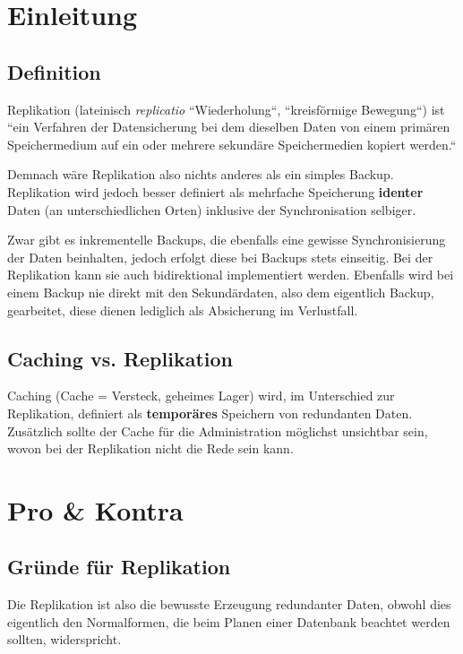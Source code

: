 
\section{Einleitung}
\subsection{Definition}
Replikation (lateinisch \textit{replicatio} \cite{duden} ``Wiederholung``, ``kreisförmige Bewegung``) \cite{dict} ist ``ein Verfahren der Datensicherung bei dem dieselben Daten von einem primären Speichermedium auf ein oder mehrere sekundäre Speichermedien kopiert werden.`` \cite{itw}

Demnach wäre Replikation also nichts anderes als ein simples Backup. Replikation wird jedoch besser definiert als mehrfache Speicherung \textbf{identer} Daten (an unterschiedlichen Orten) inklusive der Synchronisation selbiger. \cite{wiki}

Zwar gibt es inkrementelle Backups, die ebenfalls eine gewisse Synchronisierung der Daten beinhalten, jedoch erfolgt diese bei Backups stets einseitig. Bei der Replikation kann sie auch bidirektional implementiert werden. Ebenfalls wird bei einem Backup nie direkt mit den Sekundärdaten, also dem eigentlich Backup, gearbeitet, diese dienen lediglich als Absicherung im Verlustfall.

\subsection{Caching vs. Replikation}

Caching (Cache = Versteck, geheimes Lager) wird, im Unterschied zur Replikation, definiert als \textbf{temporäres} Speichern von redundanten Daten. Zusätzlich sollte der Cache für die Administration möglichst unsichtbar sein, wovon bei der Replikation nicht die Rede sein kann. \cite{kaiserslautern}

\section{Pro \& Kontra}
\subsection{Gründe für Replikation}

Die Replikation ist also die bewusste Erzeugung redundanter Daten, obwohl dies eigentlich den Normalformen, die beim Planen einer Datenbank beachtet werden sollten, widerspricht. \cite{kaiserslautern}

